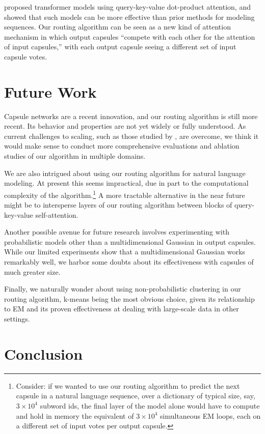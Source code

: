 \documentclass[11pt,a4paper]{article}
\begin{document}
\citet{DBLP:journals/corr/VaswaniSPUJGKP17} proposed transformer models using query-key-value dot-product attention, and showed that such models can be more effective than prior methods for modeling sequences. Our routing algorithm can be seen as a new kind of attention mechanism in which output capsules ``compete with each other for the attention of input capsules,'' with each output capsule seeing a different set of input capsule votes.

\section{Future Work}

Capsule networks are a recent innovation, and our routing algorithm is still more recent. Its behavior and properties are not yet widely or fully understood. As current challenges to scaling, such as those studied by \citet{Barham:2019:MLS:3317550.3321441}, are overcome, we think it would make sense to conduct more comprehensive evaluations and ablation studies of our algorithm in multiple domains.

We are also intrigued about using our routing algorithm for natural language modeling. At present this seems impractical, due in part to the computational complexity of the algorithm.\footnote{
	Consider: if we wanted to use our routing algorithm to predict the next capsule in a natural language sequence, over a dictionary of typical size, say, $3 \times 10^4$ subword ids, the final layer of the model alone would have to compute and hold in memory the equivalent of $3 \times 10^4$ simultaneous EM loops, each on a different set of input votes per output capsule.
} A more tractable alternative in the near future might be to intersperse layers of our routing algorithm between blocks of query-key-value self-attention.

Another possible avenue for future research involves experimenting with probabilistic models other than a multidimensional Gaussian in output capsules. While our limited experiments show that a multidimensional Gaussian works remarkably well, we harbor some doubts about its effectiveness with capsules of much greater size.

Finally, we naturally wonder about using non-probabilistic clustering in our routing algorithm, k-means being the most obvious choice, given its relationship to EM and its proven effectiveness at dealing with large-scale data in other settings.

\section{Conclusion}
\end{document}
